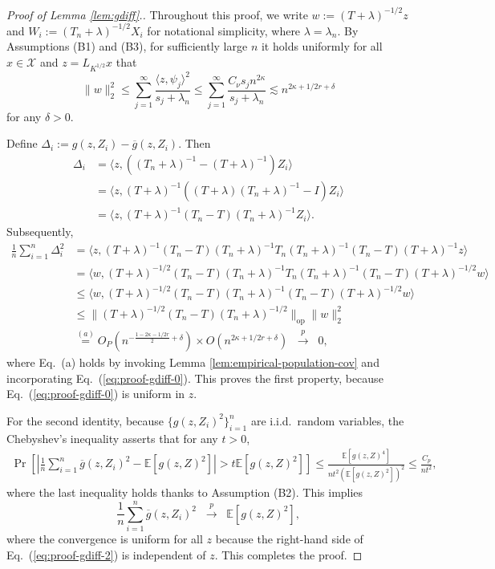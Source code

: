 \documentclass[11pt,a4paper]{article}
\renewcommand{\bar}{\overline}
\theoremstyle{definition}
\theoremstyle{plain}
\theoremstyle{remark}
\newcommand{\op}{\mathrm{op}}
\newcommand{\mX}{\mathcal X}
\begin{document}
\begin{proof}[Proof of Lemma \ref{lem:gdiff}.]
Throughout this proof, we write $w := (T+\lambda)^{-1/2} z$ and $W_i := (T_n+\lambda)^{-1/2}X_i$ for notational simplicity, where $\lambda=\lambda_n$.
By Assumptions (B1) and (B3), for sufficiently large $n$ it holds uniformly for all $x\in\mX$ and $z=L_{K^{1/2}}x$ that
\begin{equation}
\|w\|_2^2 \leq \sum_{j=1}^{\infty} \frac{\langle z,\psi_j\rangle^2}{s_j+\lambda_n} \leq \sum_{j=1}^{\infty}\frac{C_\nu s_j n^{2\kappa}}{s_j+\lambda_n} \lesssim n^{2\kappa+1/2r+\delta}
\label{eq:proof-gdiff-0}
\end{equation}
for any $\delta>0$.

Define $\Delta_i := g(z,Z_i)-\bar g(z,Z_i)$. Then
\begin{align*}
\Delta_i &= \langle z,((T_n+\lambda )^{-1}-(T+\lambda )^{-1})Z_i\rangle\nonumber\\
&= \langle z, (T+\lambda )^{-1}((T+\lambda )(T_n+\lambda )^{-1}-I)Z_i\rangle\nonumber\\
&= \langle z, (T+\lambda )^{-1}(T_n-T)(T_n+\lambda )^{-1}Z_i\rangle.
\end{align*}
Subsequently,
\begin{align}
\frac{1}{n}\sum_{i=1}^n \Delta_i^2 &= \langle z, (T+\lambda)^{-1}(T_n-T)(T_n+\lambda)^{-1}T_n(T_n+\lambda)^{-1}(T_n-T)(T+\lambda)^{-1}z\rangle\nonumber\\
&= \langle w, (T+\lambda)^{-1/2}(T_n-T)(T_n+\lambda)^{-1}T_n(T_n+\lambda)^{-1}(T_n-T)(T+\lambda)^{-1/2}w\rangle\nonumber\\
&\leq \langle w, (T+\lambda)^{-1/2}(T_n-T)(T_n+\lambda)^{-1}(T_n-T)(T+\lambda)^{-1/2}w\rangle\nonumber\\
&\leq \|(T+\lambda)^{-1/2}(T_n-T)(T_n+\lambda)^{-1/2}\|_\op\|w\|_2^2\nonumber\\
&\overset{(a)}{=} O_P\left(n^{-\frac{1-2\kappa-1/2r}{2}+\delta}\right)\times O(n^{2\kappa+1/2r+\delta}) \;\;\overset{p}{\to} \;\;0,
\end{align}
where Eq.~(a) holds by invoking Lemma \ref{lem:empirical-population-cov} and incorporating Eq.~(\ref{eq:proof-gdiff-0}). 
This proves the first property, because Eq.~(\ref{eq:proof-gdiff-0}) is uniform in $z$.

For the second identity, because $\{g(z,Z_i)^2\}_{i=1}^n$ are i.i.d.~random variables,
the Chebyshev's inequality asserts that for any $t>0$, 
\begin{align}
\Pr\left[\left|\frac{1}{n}\sum_{i=1}^n \bar g(z,Z_i)^2 - \mathbb E[g(z,Z)^2]\right| > t\mathbb E[g(z,Z)^2]\right] \leq \frac{\mathbb E[g(z,Z)^4]}{nt^2(\mathbb E[g(z,Z)^2])^2} \leq \frac{C_p}{nt^2},
\label{eq:proof-gdiff-2}
\end{align}
where the last inequality holds thanks to Assumption (B2). This implies
\begin{equation*}
\frac{1}{n}\sum_{i=1}^n\bar g(z,Z_i)^2 \;\;\overset{p}{\to}\;\; \mathbb E[g(z,Z)^2],
\end{equation*} 
where the convergence is uniform for all $z$ because the right-hand side of Eq.~(\ref{eq:proof-gdiff-2}) is independent of $z$.
This completes the proof.
\end{proof}
\end{document}
